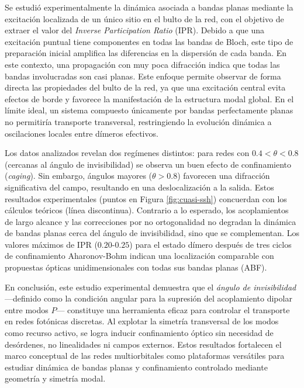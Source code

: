 Se estudió experimentalmente la dinámica asociada a bandas planas mediante la excitación localizada de un único sitio en el bulto de la red, con el objetivo de extraer el valor del \textit{Inverse Participation Ratio} (IPR). Debido a que una excitación puntual tiene componentes en todas las bandas de Bloch, este tipo de preparación inicial amplifica las diferencias en la dispersión de cada banda. En este contexto, una propagación con muy poca difracción indica que todas las bandas involucradas son casi planas. Este enfoque permite observar de forma directa las propiedades del bulto de la red, ya que una excitación central evita efectos de borde y favorece la manifestación de la estructura modal global. En el límite ideal, un sistema compuesto únicamente por bandas perfectamente planas no permitiría transporte transversal, restringiendo la evolución dinámica a oscilaciones locales entre dímeros efectivos.

Los datos analizados revelan dos regímenes distintos: para redes con $0.4 < \theta < 0.8$ (cercanas al ángulo de invisibilidad) se observa un buen efecto de confinamiento (\emph{caging}). Sin embargo, ángulos mayores ($\theta > 0.8$) favorecen una difracción significativa del campo, resultando en una deslocalización a la salida. Estos resultados experimentales (puntos en Figura \ref{fig:cuasi-ssh}) concuerdan con los cálculos teóricos (línea discontinua). Contrario a lo esperado, los acoplamientos de largo alcance y las correcciones por no ortogonalidad no degradan la dinámica de bandas planas cerca del ángulo de invisibilidad, sino que se complementan. Los valores máximos de IPR ($0.20$-$0.25$) para el estado dímero después de tres ciclos de confinamiento Aharonov-Bohm \cite{abcagingseba} indican una localización comparable con propuestas ópticas unidimensionales con todas sus bandas planas (ABF). 

En conclusión, este estudio experimental demuestra que el \textit{ángulo de invisibilidad} —definido como la condición angular para la supresión del acoplamiento dipolar entre modos $P$— constituye una herramienta eficaz para controlar el transporte en redes fotónicas discretas. Al explotar la simetría transversal de los modos como recurso activo, se logra inducir confinamiento óptico sin necesidad de desórdenes, no linealidades ni campos externos. Estos resultados fortalecen el marco conceptual de las redes multiorbitales como plataformas versátiles para estudiar dinámica de bandas planas y confinamiento controlado mediante geometría y simetría modal.

